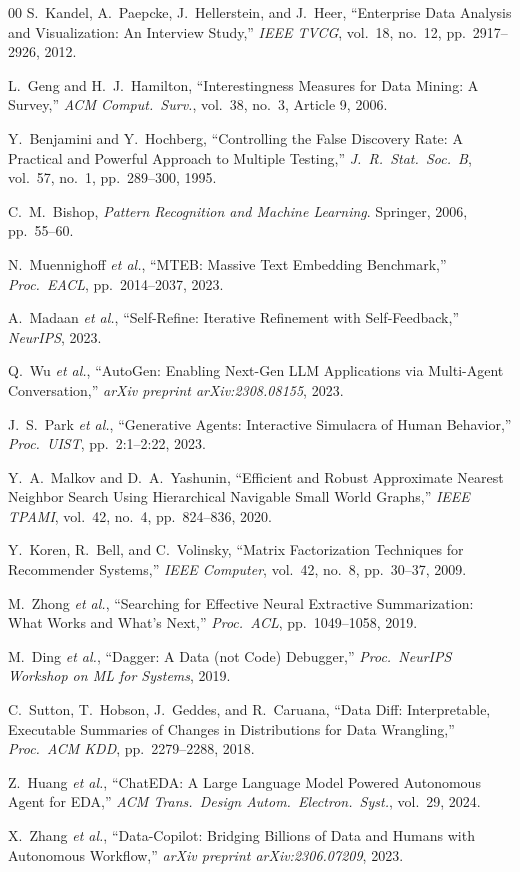\documentclass[conference]{IEEEtran}
\begin{document}
\begin{thebibliography}{00}
S.~Kandel, A.~Paepcke, J.~Hellerstein, and J.~Heer,
``Enterprise Data Analysis and Visualization: An Interview Study,''
\textit{IEEE TVCG}, vol.~18, no.~12, pp.\ 2917--2926, 2012.

L.~Geng and H.~J.~Hamilton,
``Interestingness Measures for Data Mining: A Survey,''
\textit{ACM Comput.\ Surv.}, vol.~38, no.~3, Article 9, 2006.

Y.~Benjamini and Y.~Hochberg,
``Controlling the False Discovery Rate: A Practical and Powerful
Approach to Multiple Testing,''
\textit{J.\ R.\ Stat.\ Soc.\ B}, vol.~57, no.~1, pp.\ 289--300, 1995.

C.~M.~Bishop,
\textit{Pattern Recognition and Machine Learning}.
Springer, 2006, pp.\ 55--60.

N.~Muennighoff \textit{et al.},
``MTEB: Massive Text Embedding Benchmark,''
\textit{Proc.\ EACL}, pp.\ 2014--2037, 2023.

A.~Madaan \textit{et al.},
``Self-Refine: Iterative Refinement with Self-Feedback,''
\textit{NeurIPS}, 2023.

Q.~Wu \textit{et al.},
``AutoGen: Enabling Next-Gen LLM Applications via Multi-Agent Conversation,''
\textit{arXiv preprint arXiv:2308.08155}, 2023.

J.~S.~Park \textit{et al.},
``Generative Agents: Interactive Simulacra of Human Behavior,''
\textit{Proc.\ UIST}, pp.~2:1--2:22, 2023.

Y.~A.~Malkov and D.~A.~Yashunin,
``Efficient and Robust Approximate Nearest Neighbor Search Using
Hierarchical Navigable Small World Graphs,''
\textit{IEEE TPAMI}, vol.~42, no.~4, pp.\ 824--836, 2020.

Y.~Koren, R.~Bell, and C.~Volinsky,
``Matrix Factorization Techniques for Recommender Systems,''
\textit{IEEE Computer}, vol.~42, no.~8, pp.\ 30--37, 2009.

M.~Zhong \textit{et al.},
``Searching for Effective Neural Extractive Summarization:
What Works and What's Next,''
\textit{Proc.\ ACL}, pp.\ 1049--1058, 2019.

M.~Ding \textit{et al.},
``Dagger: A Data (not Code) Debugger,''
\textit{Proc.\ NeurIPS Workshop on ML for Systems}, 2019.

C.~Sutton, T.~Hobson, J.~Geddes, and R.~Caruana,
``Data Diff: Interpretable, Executable Summaries of Changes
in Distributions for Data Wrangling,''
\textit{Proc.\ ACM KDD}, pp.\ 2279--2288, 2018.

Z.~Huang \textit{et al.},
``ChatEDA: A Large Language Model Powered Autonomous Agent
for EDA,''
\textit{ACM Trans.\ Design Autom.\ Electron.\ Syst.}, vol.~29, 2024.

X.~Zhang \textit{et al.},
``Data-Copilot: Bridging Billions of Data and Humans with
Autonomous Workflow,''
\textit{arXiv preprint arXiv:2306.07209}, 2023.

\end{thebibliography}
\end{document}

